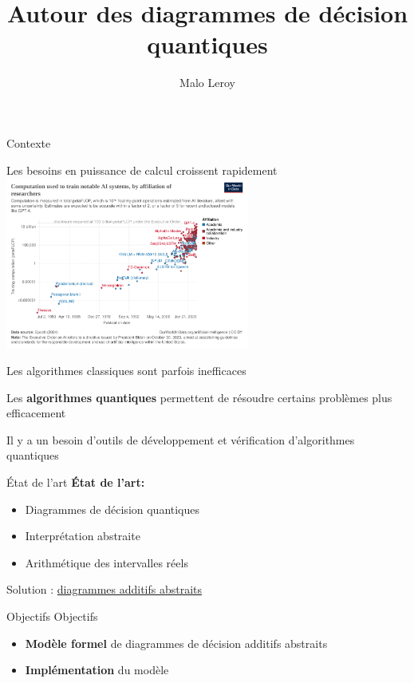 \documentclass[french, 12pt]{beamer}
\title{Autour des diagrammes de décision quantiques}
\author{Malo Leroy}
\institute{Parcours recherche -- CentraleSupélec}
\begin{document}
\begin{frame}
    \titlepage
\end{frame}

\begin{frame}{Contexte}

\begin{center}
Les besoins en puissance de calcul croissent rapidement
\includegraphics[width=0.6\textwidth]{./images/artificial-intelligence-training-computation-by-researcher-affiliation.png}

Les algorithmes classiques sont parfois inefficaces

\pause
Les \textbf{algorithmes quantiques} permettent de résoudre certains problèmes plus efficacement
\end{center}
\end{frame}

\begin{frame}
Il y a un besoin d'outils de développement et vérification d'algorithmes quantiques
\end{frame}

\begin{frame}{État de l'art}
\textbf{État de l'art:}
\begin{itemize}
    \item Diagrammes de décision quantiques
    \item Interprétation abstraite
    \item Arithmétique des intervalles réels
\end{itemize}
\pause
\begin{center}
    Solution : \underline{diagrammes additifs abstraits}
\end{center}
\end{frame}

\begin{frame}{Objectifs}
Objectifs
\begin{itemize}
    \item \textbf{Modèle formel} de diagrammes de décision additifs abstraits
    \item \textbf{Implémentation} du modèle
\end{itemize}

\end{frame}
\end{document}
